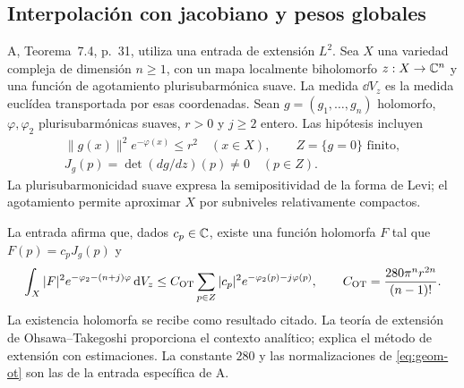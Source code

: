 \subsection{Interpolación con jacobiano y pesos globales}

A, Teorema~7.4, p.~31, utiliza una entrada de extensión $L^2$.
Sea $X$ una variedad compleja de dimensión $n\ge1$, con un mapa
localmente biholomorfo $z:X\to\mathbb{C}^n$ y una función de agotamiento
plurisubarmónica suave. La medida $\dd V_z$ es la medida euclídea
transportada por esas coordenadas. Sean $g=(g_1,\ldots,g_n)$
holomorfo, $\varphi,\varphi_2$ plurisubarmónicas suaves,
$r>0$ y $j\ge2$ entero. Las hipótesis incluyen
\begin{equation}
 \begin{gathered}
 \|g(x)\|^2e^{-\varphi(x)}\le r^2\quad(x\in X),\qquad
 Z=\{g=0\}\text{ finito},\\
 J_g(p)=\det(dg/dz)(p)\ne0\quad(p\in Z).
 \end{gathered}
 \label{eq:geom-ot-hip}
\end{equation}
La plurisubarmonicidad suave expresa la semipositividad de la
forma de Levi; el agotamiento permite aproximar $X$ por
subniveles relativamente compactos.

La entrada afirma que, dados $c_p\in\mathbb{C}$, existe una función
holomorfa $F$ tal que $F(p)=c_pJ_g(p)$ y
\begin{equation}
 \int_X|F|^2e^{-\varphi_2-(n+j)\varphi}\,\mathrm{d} V_z
 \le C_{\rm OT}\sum_{p\in Z}|c_p|^2
                           e^{-\varphi_2(p)-j\varphi(p)},
 \qquad
 C_{\rm OT}=\frac{280\pi^nr^{2n}}{(n-1)!}.
 \label{eq:geom-ot}
\end{equation}
La existencia holomorfa se recibe como resultado citado.
La teoría de extensión de Ohsawa--Takegoshi proporciona el
contexto analítico; \cite[§4]{demailly-extension} explica el
método de extensión con estimaciones.
La constante $280$ y las normalizaciones de
\eqref{eq:geom-ot} son las de la entrada específica de A.

